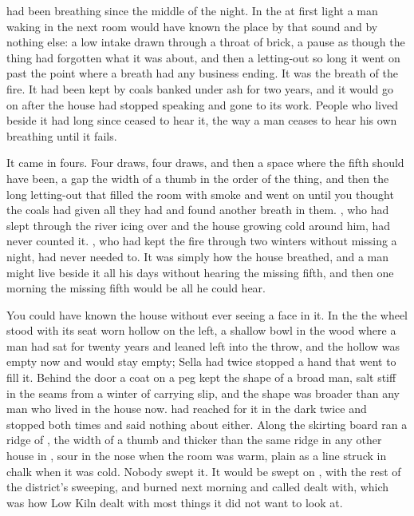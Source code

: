 
 had been breathing since the middle of the night. In the  at first light a man waking in the next room would have known the place by that sound and by nothing else: a low intake drawn through a throat of brick, a pause as though the thing had forgotten what it was about, and then a letting-out so long it went on past the point where a breath had any business ending. It was the breath of the fire. It had been kept by coals banked under ash for two years, and it would go on after the house had stopped speaking and gone to its work. People who lived beside it had long since ceased to hear it, the way a man ceases to hear his own breathing until it fails.

It came in fours. Four draws, four draws, and then a space where the fifth should have been, a gap the width of a thumb in the order of the thing, and then the long letting-out that filled the room with smoke and went on until you thought the coals had given all they had and found another breath in them. , who had slept through the river icing over and the house growing cold around him, had never counted it. , who had kept the fire through two winters without missing a night, had never needed to. It was simply how the house breathed, and a man might live beside it all his days without hearing the missing fifth, and then one morning the missing fifth would be all he could hear.

You could have known the house without ever seeing a face in it. In the  the wheel stood with its seat worn hollow on the left, a shallow bowl in the wood where a man had sat for twenty years and leaned left into the throw, and the hollow was empty now and would stay empty; Sella had twice stopped a hand that went to fill it. Behind the door a coat on a peg kept the shape of a broad man, salt stiff in the seams from a winter of carrying slip, and the shape was broader than any man who lived in the house now.  had reached for it in the dark twice and stopped both times and said nothing about either. Along the skirting board ran a ridge of , the width of a thumb and thicker than the same ridge in any other house in , sour in the nose when the room was warm, plain as a line struck in chalk when it was cold. Nobody swept it. It would be swept on , with the rest of the district's sweeping, and burned next morning and called dealt with, which was how Low Kiln dealt with most things it did not want to look at.

